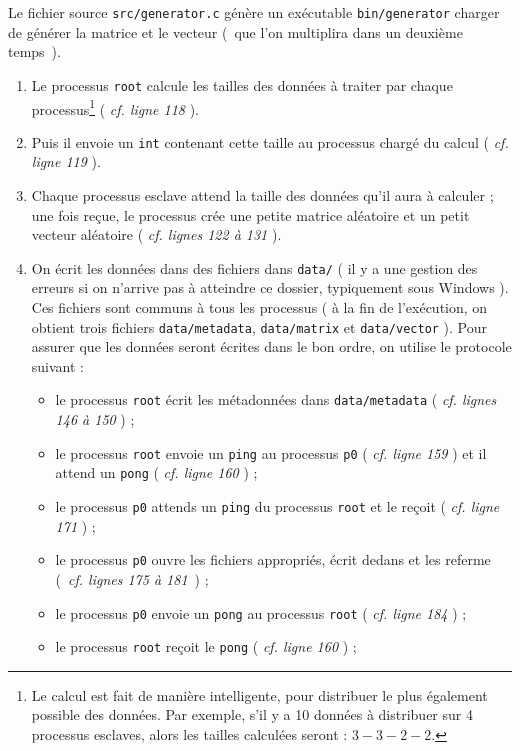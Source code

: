 \documentclass[a4paper,10pt]{article}
\begin{document}
Le fichier source \texttt{src/generator.c} génère un exécutable \texttt{bin/generator} charger de générer la matrice et le vecteur (~que l'on multiplira dans un deuxième temps~).

\bigskip

\begin{enumerate}
  \item Le processus \texttt{root} calcule les tailles des données à traiter par chaque processus\footnote{Le calcul est fait de manière intelligente, pour distribuer le plus également possible des données. Par exemple, s'il y a 10 données à distribuer sur 4 processus esclaves, alors les tailles calculées seront : $3 - 3 - 2 - 2$.} ( \textit{cf. ligne 118} ).
  \item Puis il envoie un \texttt{int} contenant cette taille au processus chargé du calcul ( \textit{cf. ligne 119} ).
  \item Chaque processus esclave attend la taille des données qu'il aura à calculer ; une fois reçue, le processus crée une petite matrice aléatoire et un petit vecteur aléatoire ( \textit{cf. lignes 122 à 131} ).
  \item On écrit les données dans des fichiers dans \texttt{data/} ( il y a une gestion des erreurs si on n'arrive pas à atteindre ce dossier, typiquement sous Windows ). Ces fichiers sont communs à tous les processus ( à la fin de l'exécution, on obtient trois fichiers \texttt{data/metadata}, \texttt{data/matrix} et \texttt{data/vector} ). Pour assurer que les données seront écrites dans le bon ordre, on utilise le protocole suivant : 
  \begin{itemize}
    \item le processus \texttt{root} écrit les métadonnées dans \texttt{data/metadata} ( \textit{cf. lignes 146 à 150} ) ;
    \item le processus \texttt{root} envoie un \texttt{ping} au processus \texttt{p0} ( \textit{cf. ligne 159} ) et il attend un \texttt{pong} ( \textit{cf. ligne 160} ) ;
    \item le processus \texttt{p0} attends un \texttt{ping} du processus \texttt{root} et le reçoit ( \textit{cf. ligne 171} ) ;
    \item le processus \texttt{p0} ouvre les fichiers appropriés, écrit dedans et les referme (~\textit{cf. lignes 175 à 181}~) ;
    \item le processus \texttt{p0} envoie un \texttt{pong} au processus \texttt{root} ( \textit{cf. ligne 184} ) ;
    \item le processus \texttt{root} reçoit le \texttt{pong} ( \textit{cf. ligne 160} ) ;

\end{itemize}
\end{enumerate}
\end{document}
